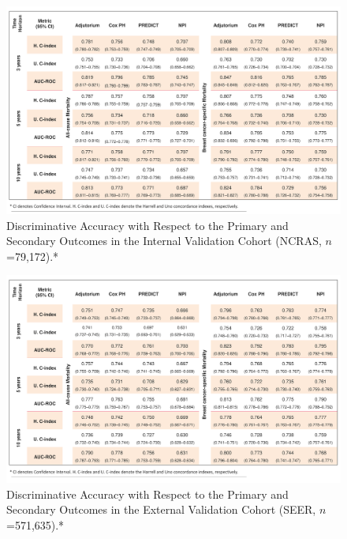 \documentclass [PhD] {uclathes}
\begin{document}
\afterpage{\clearpage}
\begin{figure}
\centering
   \includegraphics[width=9in]{ch8Table1.pdf}
    \caption{Discriminative Accuracy with Respect to the Primary and Secondary Outcomes in the Internal Validation Cohort (NCRAS, $n$=79,172).*}
    \label{ch8Table1}
\end{figure}

\afterpage{\clearpage}
\begin{figure}
\centering
   \includegraphics[width=9in]{ch8Table2.pdf}
    \caption{Discriminative Accuracy with Respect to the Primary and Secondary Outcomes in the External Validation Cohort (SEER, $n$=571,635).*}
    \label{ch8Table2}
\end{figure}
\end{document}
